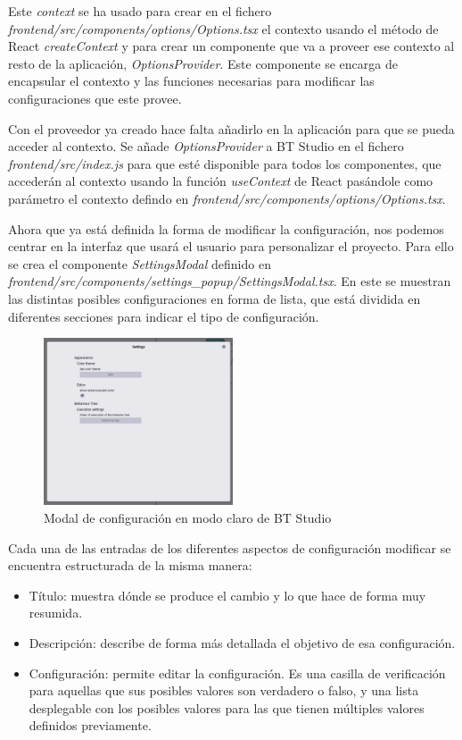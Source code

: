 Este \textit{context} se ha usado para crear en el fichero \textit{frontend/src/components/options/Options.tsx} el contexto usando el método de React \textit{createContext} y para crear un componente que va a proveer ese contexto al resto de la aplicación, \textit{OptionsProvider}. Este componente se encarga de encapsular el contexto y las funciones necesarias para modificar las configuraciones que este provee.

Con el proveedor ya creado hace falta añadirlo en la aplicación para que se pueda acceder al contexto. Se añade \textit{OptionsProvider} a BT Studio en el fichero \textit{frontend/src/index.js} para que esté disponible para todos los componentes, que accederán al contexto usando la función \textit{useContext} de React pasándole como parámetro el contexto defindo en \textit{frontend/src/components/options/Options.tsx}.

Ahora que ya está definida la forma de modificar la configuración, nos podemos centrar en la interfaz que usará el usuario para personalizar el proyecto. Para ello se crea el componente \textit{SettingsModal} definido en \textit{frontend/src/components/settings\_popup/SettingsModal.tsx}. En este se muestran las distintas posibles configuraciones en forma de lista, que está dividida en diferentes secciones para indicar el tipo de configuración.

\begin{figure}[H]
    \centering
    \includegraphics[width=0.5\textwidth]{figures/bt-avances/setting-light.png}
    \caption{Modal de configuración en modo claro de BT Studio}
    \label{fig:ejemplo}
\end{figure}

Cada una de las entradas de los diferentes aspectos de configuración modificar se encuentra estructurada de la misma manera:

\begin{itemize}
    \item Título: muestra dónde se produce el cambio y lo que hace de forma muy resumida.
    \item Descripción: describe de forma más detallada el objetivo de esa configuración.
    \item Configuración: permite editar la configuración. Es una casilla de verificación para aquellas que sus posibles valores son verdadero o falso, y una lista desplegable con los posibles valores para las que tienen múltiples valores definidos previamente.
\end{itemize}

